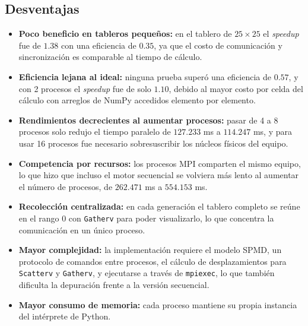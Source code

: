 \documentclass{article}
\begin{document}
\subsection{Desventajas}
\begin{itemize}
    \item \textbf{Poco beneficio en tableros pequeños:} en el tablero de $25 \times 25$ el \textit{speedup} fue de $1.38$ con una eficiencia de $0.35$, ya que el costo de comunicación y sincronización es comparable al tiempo de cálculo.
    \item \textbf{Eficiencia lejana al ideal:} ninguna prueba superó una eficiencia de $0.57$, y con 2 procesos el \textit{speedup} fue de solo $1.10$, debido al mayor costo por celda del cálculo con arreglos de NumPy accedidos elemento por elemento.
    \item \textbf{Rendimientos decrecientes al aumentar procesos:} pasar de 4 a 8 procesos solo redujo el tiempo paralelo de $127.233$ ms a $114.247$ ms, y para usar 16 procesos fue necesario sobresuscribir los núcleos físicos del equipo.
    \item \textbf{Competencia por recursos:} los procesos MPI comparten el mismo equipo, lo que hizo que incluso el motor secuencial se volviera más lento al aumentar el número de procesos, de $262.471$ ms a $554.153$ ms.
    \item \textbf{Recolección centralizada:} en cada generación el tablero completo se reúne en el rango 0 con \verb|Gatherv| para poder visualizarlo, lo que concentra la comunicación en un único proceso.
    \item \textbf{Mayor complejidad:} la implementación requiere el modelo SPMD, un protocolo de comandos entre procesos, el cálculo de desplazamientos para \verb|Scatterv| y \verb|Gatherv|, y ejecutarse a través de \verb|mpiexec|, lo que también dificulta la depuración frente a la versión secuencial.
    \item \textbf{Mayor consumo de memoria:} cada proceso mantiene su propia instancia del intérprete de Python.
\end{itemize}
\end{document}
